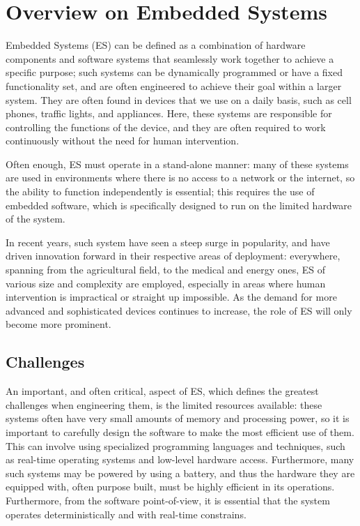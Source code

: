 \section{Overview on Embedded Systems}
Embedded Systems (ES) can be defined as a combination of hardware components and software systems that seamlessly work together to achieve a specific purpose; such systems can be dynamically programmed or have a fixed functionality set, and are often engineered to achieve their goal within a larger system. They are often found in devices that we use on a daily basis, such as cell phones, traffic lights, and appliances. Here, these systems are responsible for controlling the functions of the device, and they are often required to work continuously without the need for human intervention.

Often enough, ES must operate in a stand-alone manner: many of these systems are used in environments where there is no access to a network or the internet, so the ability to function independently is essential; this requires the use of embedded software, which is specifically designed to run on the limited hardware of the system.

In recent years, such system have seen a steep surge in popularity, and have driven innovation forward in their respective areas of deployment: everywhere, spanning from the agricultural field, to the medical and energy ones, ES of various size and complexity are employed, especially in areas where human intervention is impractical or straight up impossible.
As the demand for more advanced and sophisticated devices continues to increase, the role of ES will only become more prominent.

\subsection {Challenges}
An important, and often critical, aspect of ES, which defines the greatest challenges when engineering them, is the limited resources available: these systems often have very small amounts of memory and processing power, so it is important to carefully design the software to make the most efficient use of them. This can involve using specialized programming languages and techniques, such as real-time operating systems and low-level hardware access. Furthermore, many such systems may be powered by using a battery, and thus the hardware they are equipped with, often purpose built, must be highly efficient in its operations. Furthermore, from the software point-of-view, it is essential that the system operates deterministically and with real-time constrains.


